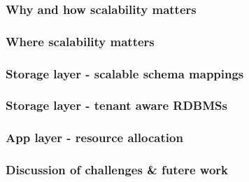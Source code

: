 
\subsubsection{Why and how scalability matters}

\subsubsection{Where scalability matters}

\subsubsection{Storage layer - scalable schema mappings}

\subsubsection{Storage layer - tenant aware RDBMSs}

\subsubsection{App layer - resource allocation}

\subsubsection{Discussion of challenges \& futere work}
